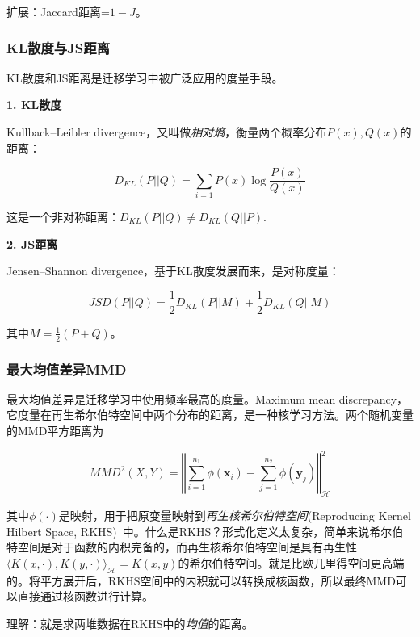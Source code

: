 扩展：Jaccard距离=$1-J$。

\subsubsection{KL散度与JS距离}

KL散度和JS距离是迁移学习中被广泛应用的度量手段。

\textbf{1. KL散度}

Kullback–Leibler divergence，又叫做\textit{相对熵}，衡量两个概率分布$P(x),Q(x)$的距离：

\begin{equation}
	\label{eq-dist-kl}
	D_{KL}(P||Q)=\sum_{i=1} P(x) \log \frac{P(x)}{Q(x)}
\end{equation}

这是一个非对称距离：$D_{KL}(P||Q) \ne D_{KL}(Q||P)$.

\textbf{2. JS距离}

Jensen–Shannon divergence，基于KL散度发展而来，是对称度量：

\begin{equation}
	\label{eq-dist-js}
	JSD(P||Q)= \frac{1}{2} D_{KL}(P||M) + \frac{1}{2} D_{KL}(Q||M)
\end{equation}

其中$M=\frac{1}{2}(P+Q)$。

\subsubsection{最大均值差异MMD}

最大均值差异是迁移学习中使用频率最高的度量。Maximum mean discrepancy，它度量在再生希尔伯特空间中两个分布的距离，是一种核学习方法。两个随机变量的MMD平方距离为

\begin{equation}
	\label{eq-dist-mmd}
	MMD^2(X,Y)=\left \Vert \sum_{i=1}^{n_1}\phi(\mathbf{x}_i)- \sum_{j=1}^{n_2}\phi(\mathbf{y}_j) \right \Vert^2_\mathcal{H}
\end{equation}

其中$\phi(\cdot)$是映射，用于把原变量映射到\textit{再生核希尔伯特空间}(Reproducing Kernel Hilbert Space, RKHS)~\cite{borgwardt2006integrating}中。什么是RKHS？形式化定义太复杂，简单来说希尔伯特空间是对于函数的内积完备的，而再生核希尔伯特空间是具有再生性$\langle K(x,\cdot),K(y,\cdot)\rangle_\mathcal{H}=K(x,y)$的希尔伯特空间。就是比欧几里得空间更高端的。将平方展开后，RKHS空间中的内积就可以转换成核函数，所以最终MMD可以直接通过核函数进行计算。

理解：就是求两堆数据在RKHS中的\textit{均值}的距离。

